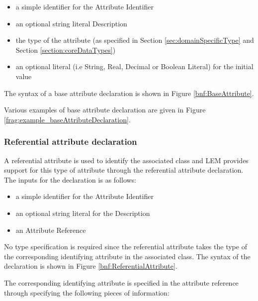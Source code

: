 \begin{itemize}
\item a simple identifier for the Attribute Identifier
\item an optional string literal Description
\item the type of the attribute (as specified in Section \ref{sec:domainSpecificType} and Section \ref{section:coreDataTypes})
\item an optional literal (i.e String, Real, Decimal or Boolean Literal) for the initial value
\end{itemize}

The syntax of a base attribute declaration is shown in Figure \ref{bnf:BaseAttribute}.


Various examples of base attribute declaration are given in Figure \ref{frag:example_baseAttributeDeclaration}.


\subsubsection{Referential attribute declaration}
A referential attribute is used to identify the associated class and LEM provides support for this type of attribute through the referential attribute declaration. The inputs for the declaration is as follows:

\begin{itemize}
\item a simple identifier for the Attribute Identifier
\item an optional string literal for the Description
\item an Attribute Reference
\end{itemize}

No type specification is required since the referential attribute takes the type of the corresponding identifying attribute in the associated class. The syntax of the declaration is shown in Figure \ref{bnf:ReferentialAttribute}.


The corresponding identifying attribute is specified in the attribute reference through specifying the following pieces of information:

